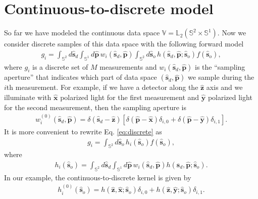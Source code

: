 \documentclass[11pt]{article}
\providecommand{\so}{\mathbf{\hat{s}}_o}
\providecommand{\sd}{\mathbf{\hat{s}}_d}
\providecommand{\pp}{\mathbf{\hat{p}}}
\providecommand{\mh}[1]{\mathbf{\hat{#1}}}
\providecommand{\mbb}[1]{\mathbb{#1}}
\providecommand{\ints}[1]{\int_{\mbb{S}^{#1}}}
\begin{document}
\section{Continuous-to-discrete model}
So far we have modeled the continuous data space
$\mbb{V} = \mbb{L}_2(\mbb{S}^2 \times \mbb{S}^1)$. Now we consider discrete
samples of this data space with the following forward model
\begin{align}
  g_i = \int_{\mbb{S}^2}d\sd\int_{\mbb{S}^1}d\pp\, w_i(\sd, \pp)\ints{2}d\so\,h(\sd,\pp;\so)f(\so),\label{eq:discrete}
\end{align}
where $g_i$ is a discrete set of $M$ measurements and $w_i(\sd, \pp)$ is the
``sampling aperture'' that indicates which part of data space $(\sd, \pp)$ we
sample during the $i$th measurement. For example, if we have a detector along
the $\mh{z}$ axis and we illuminate with $\mh{x}$ polarized light for the first
measurement and $\mh{y}$ polarized light for the second measurement, then the
sampling aperture is
\begin{align}
  w_i^{(0)}(\sd,\pp) = \delta(\sd - \mh{z})[\delta(\pp - \mh{x})\delta_{i,0} + \delta(\pp - \mh{y})\delta_{i,1}].
\end{align}
It is more convenient to rewrite Eq. \eqref{eq:discrete} as
\begin{align}
  g_i = \ints{2}d\so\,h_i(\so)f(\so),
\end{align}
where
\begin{align}
h_i(\so) = \int_{\mbb{S}^2}d\sd\int_{\mbb{S}^1}d\pp\, w_i(\sd, \pp) h(\sd,\pp;\so).
\end{align}
In our example, the continuous-to-discrete kernel is given by 
\begin{align}
  h_i^{(0)}(\so) = h(\mh{z},\mh{x};\so)\delta_{i,0} + h(\mh{z},\mh{y};\so)\delta_{i,1}.
\end{align}
\end{document}
